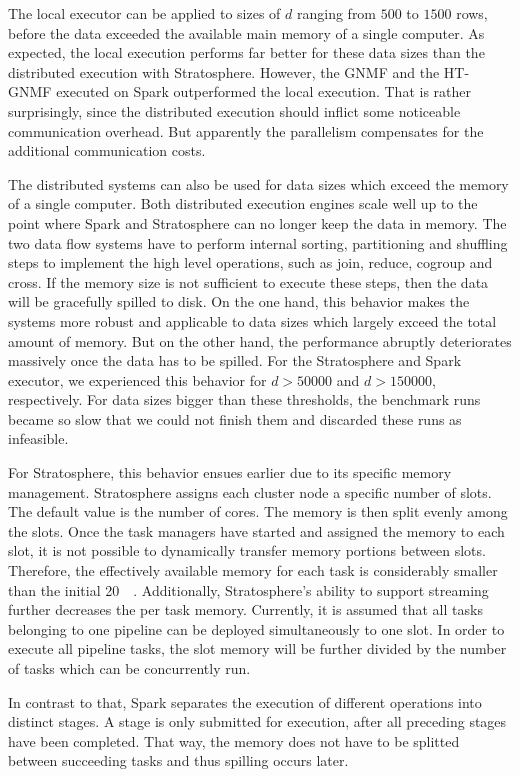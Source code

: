 The local executor can be applied to sizes of $d$ ranging from $500$ to $1500$ rows, before the data exceeded the available main memory of a single computer.
As expected, the local execution performs far better for these data sizes than the distributed execution with Stratosphere.
However, the GNMF and the HT-GNMF executed on Spark outperformed the local execution.
That is rather surprisingly, since the distributed execution should inflict some noticeable communication overhead.
But apparently the parallelism compensates for the additional communication costs.

The distributed systems can also be used for data sizes which exceed the memory of a single computer.
Both distributed execution engines scale well up to the point where Spark and Stratosphere can no longer keep the data in memory.
The two data flow systems have to perform internal sorting, partitioning and shuffling steps to implement the high level operations, such as join, reduce, cogroup and cross.
If the memory size is not sufficient to execute these steps, then the data will be gracefully spilled to disk.
On the one hand, this behavior makes the systems more robust and applicable to data sizes which largely exceed the total amount of memory.
But on the other hand, the performance abruptly deteriorates massively once the data has to be spilled.
For the Stratosphere and Spark executor, we experienced this behavior for $d>50000$ and $d>150000$, respectively.
For data sizes bigger than these thresholds, the benchmark runs became so slow that we could not finish them and discarded these runs as infeasible.

For Stratosphere, this behavior ensues earlier due to its specific memory management.
Stratosphere assigns each cluster node a specific number of slots.
The default value is the number of cores.
The memory is then split evenly among the slots.
Once the task managers have started and assigned the memory to each slot, it is not possible to dynamically transfer memory portions between slots.
Therefore, the effectively available memory for each task is considerably smaller than the initial \SI{20}{\giga\byte}.
Additionally, Stratosphere's ability to support streaming further decreases the per task memory.
Currently, it is assumed that all tasks belonging to one pipeline can be deployed simultaneously to one slot.
In order to execute all pipeline tasks, the slot memory will be further divided by the number of tasks which can be concurrently run.

In contrast to that, Spark separates the execution of different operations into distinct stages.
A stage is only submitted for execution, after all preceding stages have been completed.
That way, the memory does not have to be splitted between succeeding tasks and thus spilling occurs later.

